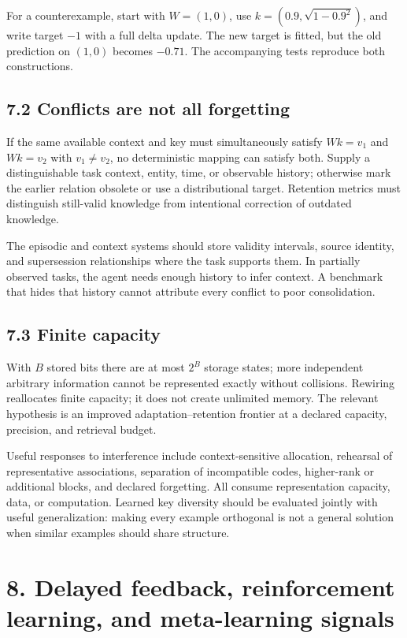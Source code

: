 \documentclass[
  11pt,
  a4paper,
]{article}
\begin{document}
For a counterexample, start with \(W=(1,0)\), use
\(k=(0.9,\sqrt{1-0.9^2})\), and write target \(-1\) with a full delta
update. The new target is fitted, but the old prediction on \((1,0)\)
becomes \(-0.71\). The accompanying tests reproduce both constructions.

\subsection{7.2 Conflicts are not all
forgetting}\label{conflicts-are-not-all-forgetting}

If the same available context and key must simultaneously satisfy
\(Wk=v_1\) and \(Wk=v_2\) with \(v_1\ne v_2\), no deterministic mapping
can satisfy both. Supply a distinguishable task context, entity, time,
or observable history; otherwise mark the earlier relation obsolete or
use a distributional target. Retention metrics must distinguish
still-valid knowledge from intentional correction of outdated knowledge.

The episodic and context systems should store validity intervals, source
identity, and supersession relationships where the task supports them.
In partially observed tasks, the agent needs enough history to infer
context. A benchmark that hides that history cannot attribute every
conflict to poor consolidation.

\subsection{7.3 Finite capacity}\label{finite-capacity}

With \(B\) stored bits there are at most \(2^B\) storage states; more
independent arbitrary information cannot be represented exactly without
collisions. Rewiring reallocates finite capacity; it does not create
unlimited memory. The relevant hypothesis is an improved
adaptation--retention frontier at a declared capacity, precision, and
retrieval budget.

Useful responses to interference include context-sensitive allocation,
rehearsal of representative associations, separation of incompatible
codes, higher-rank or additional blocks, and declared forgetting. All
consume representation capacity, data, or computation. Learned key
diversity should be evaluated jointly with useful generalization: making
every example orthogonal is not a general solution when similar examples
should share structure.

\section{8. Delayed feedback, reinforcement learning, and meta-learning
signals}\label{delayed-feedback-reinforcement-learning-and-meta-learning-signals}
\end{document}
